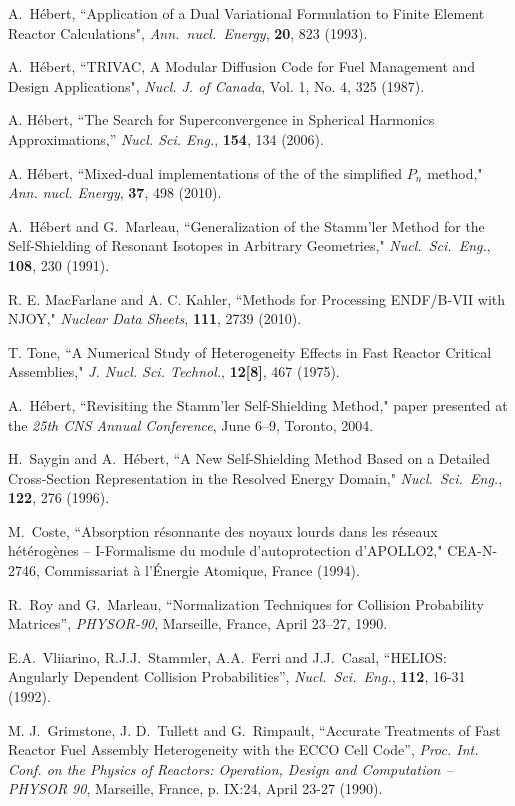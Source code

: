 \begin{thebibliography}{99}
A.~H\'ebert, ``Application of a Dual Variational Formulation to Finite Element
Reactor Calculations", {\sl Ann.~nucl.~Energy}, {\bf 20}, 823 (1993).

A.~H\'ebert, ``TRIVAC, A Modular Diffusion Code for Fuel Management and Design
Applications", {\sl Nucl. J. of Canada}, Vol. 1, No. 4, 325 (1987).

A. H\'ebert, ``The Search for Superconvergence in Spherical Harmonics Approximations,'' {\sl Nucl. Sci. Eng.}, {\bf 154}, 134 (2006).

A. H\'ebert, ``Mixed-dual implementations of the of the simplified $P_n$ method," {\sl Ann. nucl. Energy}, {\bf 37}, 498 (2010).

A.~H\'ebert and G.~Marleau, ``Generalization of the Stamm'ler Method for the
Self-Shielding of Resonant Isotopes in Arbitrary Geometries," {\sl
Nucl.~Sci.~Eng.}, {\bf 108}, 230 (1991).

R. E. MacFarlane and A. C. Kahler, ``Methods for Processing ENDF/B-VII with NJOY," {\sl Nuclear Data Sheets}, {\bf 111}, 2739 (2010).

T. Tone, ``A Numerical Study of Heterogeneity Effects in Fast Reactor Critical Assemblies," {\sl J. Nucl. Sci. Technol.}, {\bf 12[8]}, 467 (1975).

A.~H\'ebert, ``Revisiting the Stamm'ler Self-Shielding Method," paper presented at the
\textsl{25th CNS Annual Conference}, June 6--9, Toronto, 2004.

H.~Saygin and  A.~H\'ebert, ``A New Self-Shielding Method Based on a Detailed
Cross-Section Representation in the Resolved Energy Domain,"
{\sl Nucl.~Sci.~Eng.}, {\bf 122}, 276 (1996).

M.~Coste, ``Absorption r\'esonnante des noyaux lourds dans les
r\'eseaux h\'et\'erog\`enes -- I-Formalisme du module
d'autoprotection d'APOLLO2,"
CEA-N-2746, Commissariat \`a l'\'Energie Atomique, France (1994).

R.~Roy and G.~Marleau, ``Normalization Techniques for Collision Probability
Matrices'', {\sl PHYSOR-90}, Marseille, France, April 23--27, 1990.

E.A.~Vliiarino, R.J.J.~Stammler, A.A.~Ferri and J.J.~Casal, ``HELIOS: Angularly
Dependent Collision Probabilities'', {\sl
Nucl.~Sci.~Eng.}, {\bf 112}, 16-31 (1992).

M. J.~Grimstone, J. D.~Tullett and G.~Rimpault, ``Accurate Treatments of
Fast Reactor Fuel Assembly Heterogeneity with the ECCO Cell Code'',
{\sl Proc. Int. Conf. on the Physics of Reactors: Operation, Design and
Computation -- PHYSOR 90}, Marseille, France, p. IX:24, April 23-27 (1990).


\end{thebibliography}
